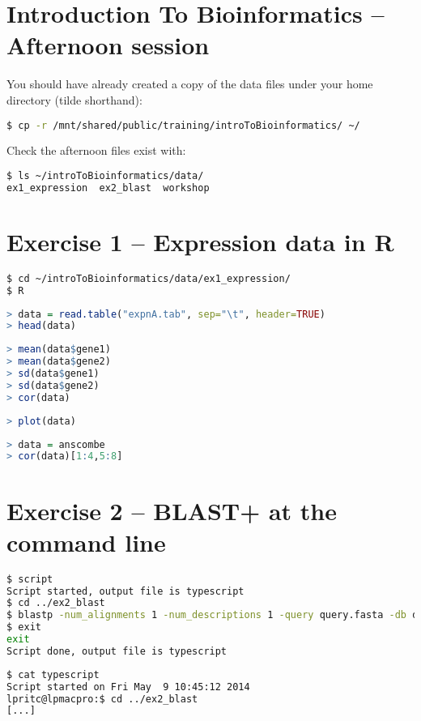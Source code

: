 \documentclass[a4paper]{article}
\begin{document}
\section*{Introduction To Bioinformatics -- Afternoon session}

You should have already created a copy of the data files under your home directory (tilde shorthand):
\begin{lstlisting}[language=bash]
$ cp -r /mnt/shared/public/training/introToBioinformatics/ ~/
\end{lstlisting}

Check the afternoon files exist with:
\begin{lstlisting}[language=bash]
$ ls ~/introToBioinformatics/data/
ex1_expression  ex2_blast  workshop
\end{lstlisting}

\section*{Exercise 1 -- Expression data in R}

\begin{lstlisting}[language=bash]
$ cd ~/introToBioinformatics/data/ex1_expression/
$ R
\end{lstlisting}

\begin{lstlisting}[language=R]
> data = read.table("expnA.tab", sep="\t", header=TRUE)
> head(data)
\end{lstlisting}

\begin{lstlisting}[language=R]
> mean(data$gene1)
> mean(data$gene2)
> sd(data$gene1)
> sd(data$gene2)
> cor(data)
\end{lstlisting}

\begin{lstlisting}[language=R]
> plot(data)
\end{lstlisting}

\begin{lstlisting}[language=R]
> data = anscombe
> cor(data)[1:4,5:8]
\end{lstlisting}

\section*{Exercise 2 -- BLAST+ at the command line}

\begin{lstlisting}[language=bash]
$ script
Script started, output file is typescript
$ cd ../ex2_blast
$ blastp -num_alignments 1 -num_descriptions 1 -query query.fasta -db dbA
$ exit
exit
Script done, output file is typescript
\end{lstlisting} 

\begin{lstlisting}[language=bash]
$ cat typescript
Script started on Fri May  9 10:45:12 2014
lpritc@lpmacpro:$ cd ../ex2_blast
[...]
\end{lstlisting}   
\end{document}
